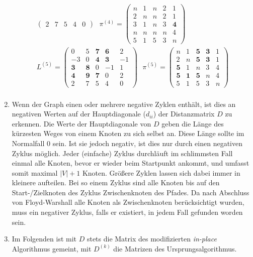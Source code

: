 \documentclass[11pt,a4paper]{article}
\begin{document}
\begin{loesung}
\begin{enumerate}
\begin{align*}
\begin{pmatrix}
                2 & 7 & 5 & 4 & 0
            \end{pmatrix}
            \,\,\,\,
            \pi^{(4)} =
            \begin{pmatrix}
                n & 1 & n & 2 & 1 \\
                2 & n & n & 2 & 1 \\
                3 & 1 & n & 3 & \mathbf{4} \\
                n & n & n & n & 4 \\
                5 & 1 & 5 & 3 & n
            \end{pmatrix}
            \\
            L^{(5)} =
            \begin{pmatrix}
                0 & 5 & \mathbf{7} & \mathbf{6} & 2 \\
                -3 & 0 & \mathbf{4} & \mathbf{3} & -1 \\
                \mathbf{3} & \mathbf{8} & 0 & -1 & 1 \\
                \mathbf{4} & \mathbf{9} & \mathbf{7} & 0 & 2 \\
                2 & 7 & 5 & 4 & 0
            \end{pmatrix}
            \,\,\,\,
            \pi^{(5)} =
            \begin{pmatrix}
                n & 1 & \mathbf{5} & \mathbf{3} & 1 \\
                2 & n & \mathbf{5} & \mathbf{3} & 1 \\
                \mathbf{5} & 1 & n & 3 & 4 \\
                \mathbf{5} & \mathbf{1} & \mathbf{5} & n & 4 \\
                5 & 1 & 5 & 3 & n
            \end{pmatrix}
            \\
        \end{align*}

        \item
        Wenn der Graph einen oder mehrere negative Zyklen enthält, ist dies an negativen Werten auf der Hauptdiagonale ($d_{ii}$) der Distanzmatrix $D$ zu erkennen.
        Die Werte der Hauptdiagonale von $D$ geben die Länge des kürzesten Weges von einem Knoten zu sich selbst an.
        Diese Länge sollte im Normalfall 0 sein.
        Ist sie jedoch negativ, ist dies nur durch einen negativen Zyklus möglich.
        Jeder (einfache) Zyklus durchläuft im schlimmsten Fall einmal alle Knoten, bevor er wieder beim Startpunkt ankommt, und umfasst somit maximal $|V|+1$ Knoten.
        Größere Zyklen lassen sich dabei immer in kleinere aufteilen.
        Bei so einem  Zyklus sind alle Knoten bis auf den Start-/Zielknoten des Zyklus Zwischenknoten des Pfades.
        Da nach Abschluss von Floyd-Warshall alle Knoten als Zwischenknoten berücksichtigt wurden, muss ein negativer Zyklus, falls er existiert, in jedem Fall gefunden worden sein.
        \item
        Im Folgenden ist mit $D$ stets die Matrix des modifizierten \emph{in-place} Algorithmus gemeint, mit $D^{(k)}$ die Matrizen des Ursprungsalgorithmus.


\end{enumerate}
\end{loesung}
\end{document}
